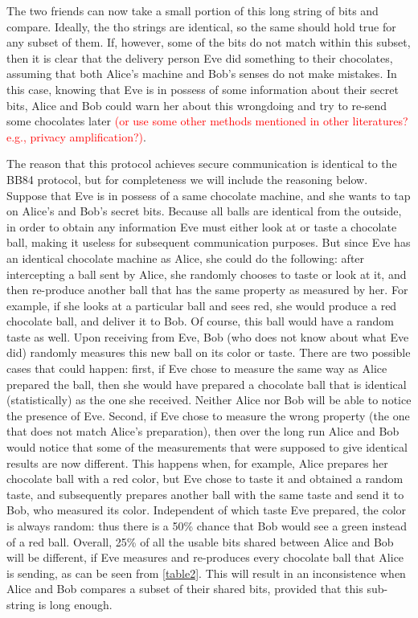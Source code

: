 \documentclass{article}
\def \todo #1{\textcolor{red}{#1}}
\begin{document}
The two friends can now take a small portion of this long string of bits and compare.
Ideally, the tho strings are identical, so the same should hold true for any subset of them.
If, however, some of the bits do not match within this subset, then it is clear that the delivery person Eve did something to their chocolates, assuming that both Alice's machine and Bob's senses do not make mistakes.
In this case, knowing that Eve is in possess of some information about their secret bits, Alice and Bob could warn her about this wrongdoing and try to re-send some chocolates later \todo{(or use some other methods mentioned in other literatures? e.g., privacy amplification?)}.


The reason that this protocol achieves secure communication is identical to the BB84 protocol, but for completeness we will include the reasoning below.
Suppose that Eve is in possess of a same chocolate machine, and she wants to tap on Alice's and Bob's secret bits.
Because all balls are identical from the outside, in order to obtain any information Eve must either look at or taste a chocolate ball, making it useless for subsequent communication purposes.
But since Eve has an identical chocolate machine as Alice, she could do the following: after intercepting a ball sent by Alice, she randomly chooses to taste or look at it, and then re-produce another ball that has the same property as measured by her.
For example, if she looks at a particular ball and sees red, she would produce a red chocolate ball, and deliver it to Bob.
Of course, this ball would have a random taste as well.
Upon receiving from Eve, Bob (who does not know about what Eve did) randomly measures this new ball on its color or taste.
There are two possible cases that could happen: first, if Eve chose to measure the same way as Alice prepared the ball, then she would have prepared a chocolate ball that is identical (statistically) as the one she received.
Neither Alice nor Bob will be able to notice the presence of Eve.
Second, if Eve chose to measure the wrong property (the one that does not match Alice's preparation), then over the long run Alice and Bob would notice that some of the measurements that were supposed to give identical results are now different.
This happens when, for example, Alice prepares her chocolate ball with a red color, but Eve chose to taste it and obtained a random taste, and subsequently prepares another ball with the same taste and send it to Bob, who measured its color.
Independent of which taste Eve prepared, the color is always random: thus there is a 50\% chance that Bob would see a green instead of a red ball.
Overall, 25\% of all the usable bits shared between Alice and Bob will be different, if Eve measures and re-produces every chocolate ball that Alice is sending, as can be seen from \cref{table2}.
This will result in an inconsistence when Alice and Bob compares a subset of their shared bits, provided that this sub-string is long enough.
\end{document}
